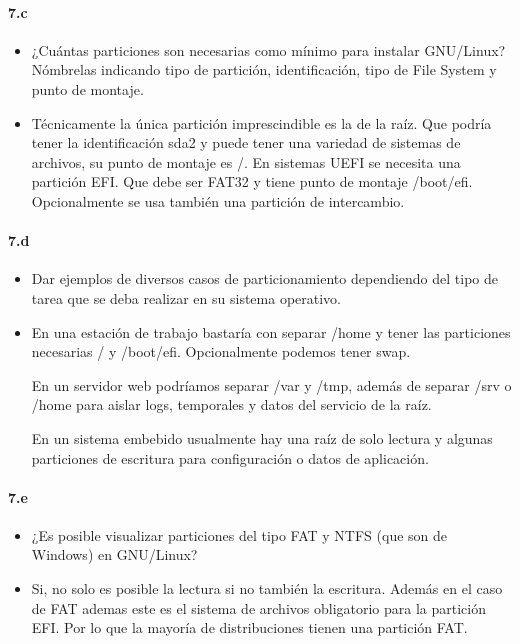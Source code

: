 \documentclass[10pt,a4paper]{paper}
\begin{document}
	
	\paragraph{7.c}
	\begin{itemize}
		\item ¿Cuántas particiones son necesarias como mínimo para instalar GNU/Linux?
		Nómbrelas indicando tipo de partición, identificación, tipo de File System y
		punto de montaje.
		
		\item Técnicamente la única partición imprescindible es la de la raíz. Que
		podría tener la identificación sda2 y  puede tener una variedad de sistemas de
		archivos, su punto de montaje es /. En sistemas UEFI se necesita una partición
		EFI. Que debe ser FAT32 y tiene punto de montaje /boot/efi. Opcionalmente se usa
		también una partición de intercambio.
	\end{itemize}
	
	
	
	
	
	\paragraph{7.d}
	\begin{itemize}
		\item Dar ejemplos de diversos casos de particionamiento dependiendo del tipo
		de tarea que se deba realizar en su sistema operativo.
		
		\item En una estación de trabajo bastaría con separar /home y tener las
		particiones necesarias / y /boot/efi. Opcionalmente podemos tener swap.
		
		
		En un servidor web podríamos separar /var y /tmp, además de separar /srv o
		/home para aislar logs, temporales y datos del servicio de la raíz.
		
		En un sistema embebido usualmente hay una raíz de solo lectura y algunas
		particiones de escritura para configuración o datos de aplicación.
	\end{itemize}
	
	
	
	\paragraph{7.e}
	\begin{itemize}
		\item ¿Es posible visualizar particiones del tipo FAT y NTFS (que son de
		Windows) en GNU/Linux?
		
		\item Si, no solo es posible la lectura si no también la escritura. Además en
		el caso de FAT ademas este es el sistema de archivos obligatorio para la
		partición EFI. Por lo que la mayoría de distribuciones tienen una partición FAT.
	\end{itemize}
	
\end{document}
